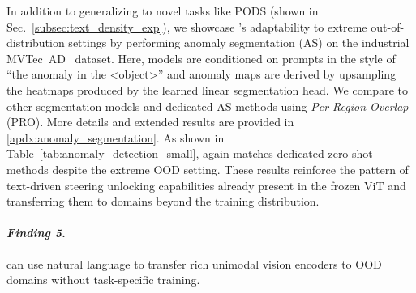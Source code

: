 In addition to generalizing to novel tasks like PODS (shown in Sec.~\ref{subsec:text_density_exp}), we showcase \model{}'s adaptability to extreme out-of-distribution settings by performing anomaly segmentation (AS) on the industrial MVTec~AD~\cite{bergmann_mvtech} dataset. %
Here, models are conditioned on prompts in the style of ``the anomaly in the <object>'' and anomaly maps are derived by upsampling the heatmaps produced by the learned linear segmentation head. We compare \model{} to other segmentation models and dedicated AS methods using \textit{Per-Region-Overlap} (PRO).
More details and extended results are provided in \cref{apdx:anomaly_segmentation}.
As shown in Table~\ref{tab:anomaly_detection_small}, \model{} again matches dedicated zero-shot methods despite the extreme OOD setting.
These results reinforce the pattern of text-driven steering unlocking capabilities already present in the frozen ViT and transferring them to domains beyond the training distribution. 

\iffindingbox
\begin{tcolorbox}[colback=\findingcolor,
colframe=black, arc=4pt, boxsep=1pt]
\paragraph{\textbf{\textit{Finding 5}.}}
\model{} can use natural language to transfer rich unimodal vision encoders to OOD domains without task-specific training.
\end{tcolorbox}
\fi
